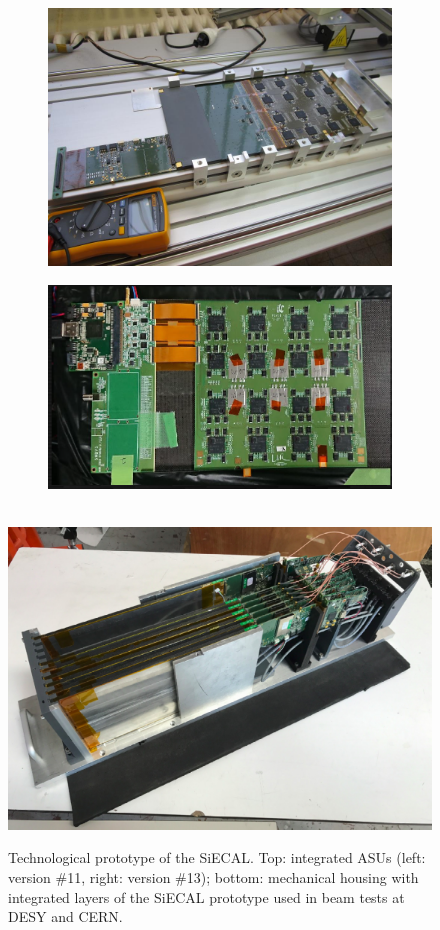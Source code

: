 \begin{figure}[t!]
\centering
\begin{subfigure}{0.45\textwidth}
\includegraphics[width=0.9\hsize]{Detector/fig/siwecal-fev12.jpg}
\end{subfigure}
\begin{subfigure}{0.45\textwidth}
\includegraphics[width=1.1\hsize]{Detector/fig/siwecal-fev13.png}\\
\end{subfigure} \\ 
\includegraphics[width=0.50\hsize]{Detector/fig/siwecal-tp.png}
\caption{Technological prototype of the SiECAL. Top: integrated ASUs (left: version \#11, right: version \#13); bottom: mechanical housing with integrated layers of the SiECAL prototype used in beam tests at DESY and CERN.}
\label{fig:det:SiWECAL_proto}
\end{figure}




